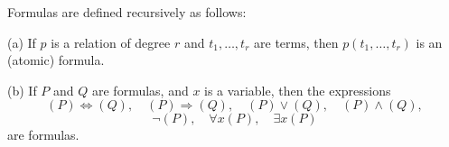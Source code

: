 Formulas are defined recursively as follows:

(a) If $p$ is a relation of degree $r$ and $t_1, \ldots, t_r$ are terms, then $p(t_1, \ldots, t_r)$ is an (atomic) formula.

(b) If $P$ and $Q$ are formulas, and $x$ is a variable, then the expressions
$$
(P) \Leftrightarrow (Q),\quad (P) \Rightarrow (Q),\quad (P) \vee (Q),\quad (P) \wedge (Q),
$$
$$
\neg(P),\quad \forall x(P),\quad \exists x(P)
$$
are formulas.
